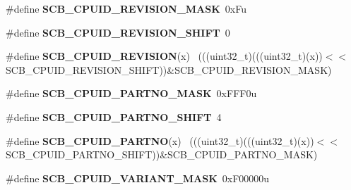 \begin{DoxyCompactItemize}
\item 
\hypertarget{group___s_c_b___register___masks_ga85fcec5a1a285bf2ead09d715e7fd825}{}\#define {\bfseries S\+C\+B\+\_\+\+C\+P\+U\+I\+D\+\_\+\+R\+E\+V\+I\+S\+I\+O\+N\+\_\+\+M\+A\+S\+K}~0x\+Fu\label{group___s_c_b___register___masks_ga85fcec5a1a285bf2ead09d715e7fd825}

\item 
\hypertarget{group___s_c_b___register___masks_ga6c4bd208cc5af38612bf38b291f8312d}{}\#define {\bfseries S\+C\+B\+\_\+\+C\+P\+U\+I\+D\+\_\+\+R\+E\+V\+I\+S\+I\+O\+N\+\_\+\+S\+H\+I\+F\+T}~0\label{group___s_c_b___register___masks_ga6c4bd208cc5af38612bf38b291f8312d}

\item 
\hypertarget{group___s_c_b___register___masks_gad84b7d9f172bb11a61e873c8316feaac}{}\#define {\bfseries S\+C\+B\+\_\+\+C\+P\+U\+I\+D\+\_\+\+R\+E\+V\+I\+S\+I\+O\+N}(x)                                    ~(((uint32\+\_\+t)(((uint32\+\_\+t)(x))$<$$<$S\+C\+B\+\_\+\+C\+P\+U\+I\+D\+\_\+\+R\+E\+V\+I\+S\+I\+O\+N\+\_\+\+S\+H\+I\+F\+T))\&S\+C\+B\+\_\+\+C\+P\+U\+I\+D\+\_\+\+R\+E\+V\+I\+S\+I\+O\+N\+\_\+\+M\+A\+S\+K)\label{group___s_c_b___register___masks_gad84b7d9f172bb11a61e873c8316feaac}

\item 
\hypertarget{group___s_c_b___register___masks_ga59f6aaadd9ecf7fed4e622ab8052f8d4}{}\#define {\bfseries S\+C\+B\+\_\+\+C\+P\+U\+I\+D\+\_\+\+P\+A\+R\+T\+N\+O\+\_\+\+M\+A\+S\+K}~0x\+F\+F\+F0u\label{group___s_c_b___register___masks_ga59f6aaadd9ecf7fed4e622ab8052f8d4}

\item 
\hypertarget{group___s_c_b___register___masks_gac28acf4ce5242a53961b9549e7dd0115}{}\#define {\bfseries S\+C\+B\+\_\+\+C\+P\+U\+I\+D\+\_\+\+P\+A\+R\+T\+N\+O\+\_\+\+S\+H\+I\+F\+T}~4\label{group___s_c_b___register___masks_gac28acf4ce5242a53961b9549e7dd0115}

\item 
\hypertarget{group___s_c_b___register___masks_gafa3a6f28ced4e51aab9188686cc87434}{}\#define {\bfseries S\+C\+B\+\_\+\+C\+P\+U\+I\+D\+\_\+\+P\+A\+R\+T\+N\+O}(x)                                        ~(((uint32\+\_\+t)(((uint32\+\_\+t)(x))$<$$<$S\+C\+B\+\_\+\+C\+P\+U\+I\+D\+\_\+\+P\+A\+R\+T\+N\+O\+\_\+\+S\+H\+I\+F\+T))\&S\+C\+B\+\_\+\+C\+P\+U\+I\+D\+\_\+\+P\+A\+R\+T\+N\+O\+\_\+\+M\+A\+S\+K)\label{group___s_c_b___register___masks_gafa3a6f28ced4e51aab9188686cc87434}

\item 
\hypertarget{group___s_c_b___register___masks_ga42f96b8e820835b499d29a04e593d363}{}\#define {\bfseries S\+C\+B\+\_\+\+C\+P\+U\+I\+D\+\_\+\+V\+A\+R\+I\+A\+N\+T\+\_\+\+M\+A\+S\+K}~0x\+F00000u\label{group___s_c_b___register___masks_ga42f96b8e820835b499d29a04e593d363}


\end{DoxyCompactItemize}

